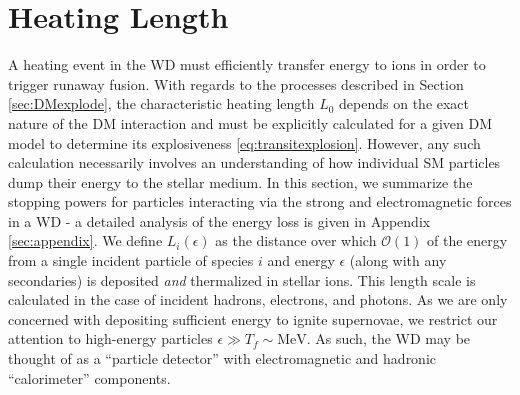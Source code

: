\documentclass[twocolumn,showpacs,preprintnumbers,amsmath,amssymb,prd]{revtex4}
\newcommand{\OO}{\mathcal{O}}
\begin{document}
\section{Heating Length}
\label{sec:HeatingLength}
A heating event in the WD must efficiently transfer energy to ions in order to trigger runaway fusion. With regards to the processes described in Section \ref{sec:DMexplode}, the characteristic heating length $L_0$ depends on the exact nature of the DM interaction and must be explicitly calculated for a given DM model to determine its explosiveness \eqref{eq:transitexplosion}. However, any such calculation necessarily involves an understanding of how individual SM particles dump their energy to the stellar medium. In this section, we summarize the stopping powers for particles interacting via the strong and electromagnetic forces in a WD - a detailed analysis of the energy loss is given in Appendix \ref{sec:appendix}. We define $L_i(\epsilon)$ as the distance over which $\OO(1)$ of the energy from a single incident particle of species $i$ and energy $\epsilon$ (along with any secondaries) is deposited \emph{and} thermalized in stellar ions. This length scale is calculated in the case of incident hadrons, electrons, and photons. As we are only concerned with depositing sufficient energy to ignite supernovae, we restrict our attention to high-energy particles $\epsilon \gg T_f \sim \text{MeV}$. As such, the WD may be thought of as a ``particle detector'' with electromagnetic and hadronic ``calorimeter'' components.
\end{document}
